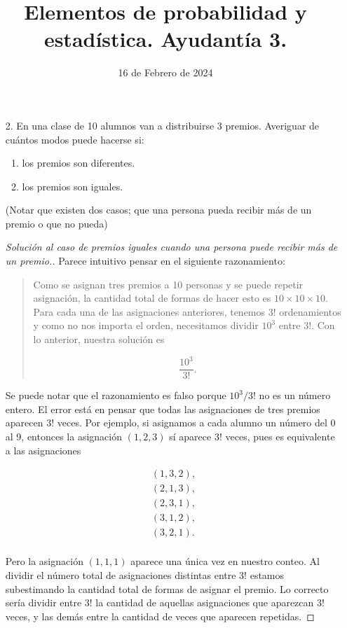\documentclass{article}
\title{Elementos de probabilidad y estadística. Ayudantía 3.}
\date{16 de Febrero de 2024}
\begin{document}
\maketitle

\begin{enumerate}
    \item[2.] En una clase de 10 alumnos van a distribuirse 3 premios. Averiguar de cuántos modos
    puede hacerse si:

    \begin{enumerate}
        \item los premios son diferentes.
        \item los premios son iguales.
    \end{enumerate}

    (Notar que existen dos casos; que una persona pueda recibir más de un premio o que no pueda)

    \begin{proof}[Solución al caso de premios iguales cuando una persona puede recibir más de un premio.]

        Parece intuitivo pensar en el siguiente razonamiento:
        \begin{quote}
            Como se asignan tres premios a 10 personas y se puede repetir asignación, la cantidad total de formas de hacer esto es $10\times 10 \times 10$. Para cada una de las asignaciones anteriores, tenemos $3!$ ordenamientos y como no nos importa el orden, necesitamos dividir $10^3$ entre $3!$. Con lo anterior, nuestra solución es 

            \[ \frac{10^3}{3!}.\]
        \end{quote}
    
    Se puede notar que el razonamiento es falso porque $10^3/3!$ no es un número entero. El error está en pensar que todas las asignaciones de tres premios aparecen $3!$ veces. Por ejemplo, si asignamos a cada alumno un número del 0 al 9, entonces la asignación $(1,2,3)$ sí aparece $3!$ veces, pues es equivalente a las asignaciones

    \begin{align*}
        (1,3,2),\\
        (2,1,3),\\
        (2,3,1),\\
        (3,1,2),\\
        (3,2,1).\\
    \end{align*}

    Pero la asignación $(1,1,1)$ aparece una única vez en nuestro conteo. Al dividir el número total de asignaciones distintas entre $3!$ estamos subestimando la cantidad total de formas de asignar el premio. Lo correcto sería dividir entre $3!$ la cantidad de aquellas asignaciones que aparezcan $3!$ veces, y las demás entre la cantidad de veces que aparecen repetidas.


\end{proof}
\end{enumerate}
\end{document}
